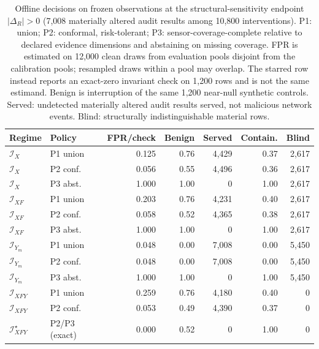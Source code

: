 \begin{table}[!t]
\caption{Offline decisions on frozen observations at the structural-sensitivity endpoint $|\Delta_R|>0$ (7,008 materially altered audit results among 10,800 interventions). P1: union; P2: conformal, risk-tolerant; P3: sensor-coverage-complete relative to declared evidence dimensions and abstaining on missing coverage. FPR is estimated on 12,000 clean draws from evaluation pools disjoint from the calibration pools; resampled draws within a pool may overlap. The starred row instead reports an exact-zero invariant check on 1,200 rows and is not the same estimand. Benign is interruption of the same 1,200 near-null synthetic controls. Served: undetected materially altered audit results served, not malicious network events. Blind: structurally indistinguishable material rows.}
\label{tab:policy}
\centering
\scriptsize
\setlength{\tabcolsep}{2pt}
\begin{tabular}{@{}llrrrrr@{}}
\toprule
Regime & Policy & FPR/check & Benign & Served & Contain. & Blind \\
\midrule
$\mathcal I_X$ & P1 union & 0.125 & 0.76 & 4,429 & 0.37 & 2,617 \\
$\mathcal I_X$ & P2 conf. & 0.056 & 0.55 & 4,496 & 0.36 & 2,617 \\
$\mathcal I_X$ & P3 abst. & 1.000 & 1.00 & 0 & 1.00 & 2,617 \\
\addlinespace[1pt]
$\mathcal I_{XF}$ & P1 union & 0.203 & 0.76 & 4,231 & 0.40 & 2,617 \\
$\mathcal I_{XF}$ & P2 conf. & 0.058 & 0.52 & 4,365 & 0.38 & 2,617 \\
$\mathcal I_{XF}$ & P3 abst. & 1.000 & 1.00 & 0 & 1.00 & 2,617 \\
\addlinespace[1pt]
$\mathcal I_{Y_m}$ & P1 union & 0.048 & 0.00 & 7,008 & 0.00 & 5,450 \\
$\mathcal I_{Y_m}$ & P2 conf. & 0.048 & 0.00 & 7,008 & 0.00 & 5,450 \\
$\mathcal I_{Y_m}$ & P3 abst. & 1.000 & 1.00 & 0 & 1.00 & 5,450 \\
\addlinespace[1pt]
$\mathcal I_{XFY}$ & P1 union & 0.259 & 0.76 & 4,180 & 0.40 & 0 \\
$\mathcal I_{XFY}$ & P2 conf. & 0.053 & 0.49 & 4,390 & 0.37 & 0 \\
\addlinespace[1pt]
$\mathcal I_{XFY}^{\star}$ & P2/P3 (exact) & 0.000 & 0.52 & 0 & 1.00 & 0 \\
\bottomrule
\end{tabular}
\end{table}

